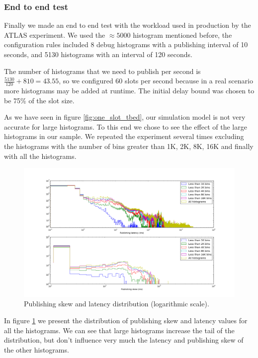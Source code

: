 \subsubsection*{End to end test}

Finally we made an end to end test with the workload used in production by the ATLAS experiment. We used the $\approx 5000$ histogram mentioned before, the configuration rules included 8 debug histograms with a publishing interval of 10 seconds, and 5130 histograms with an interval of 120 seconds.

The number of histograms that we need to publish per second is $\frac {5130}{120} + {8}{10} = 43.55$, so we configured 60 slots per second because in a real scenario more histograms may be added at runtime. The initial delay bound was chosen to be 75\% of the slot size.

As we have seen in figure \ref{fig:one_slot_tbed}, our simulation model is not very accurate for large histograms. To this end we chose to see the effect of the large histograms in our sample. We repeated the experiment several times excluding the histograms with the number of bins greater than 1K, 2K, 8K, 16K and finally with all the histograms. 

\begin{figure}[ht]
\centering
\includegraphics[width=\textwidth]{Images/e2e_histograms.png}
\caption[Publishing skew and latency distribution.]{Publishing skew and latency distribution (logarithmic scale).}
\label{fig:e2e_histograms}
\end{figure}

In figure \ref{fig:e2e_histograms} we present the distribution of publishing skew and latency values for all the histograms. We can see that large histograms increase the tail of the distribution, but don't influence very much the latency and publishing skew of the other histograms.


